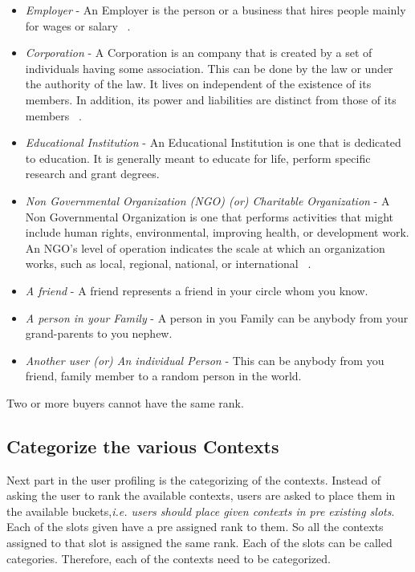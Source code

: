 \begin{itemize}
\item {\it Employer} - An Employer is the person or a business that hires people mainly for wages or salary ~\cite{employerdict}.
\item {\it Corporation} - A Corporation is an company that is created by a set of
individuals having some association. This can be done by the law or under the authority of the law. It lives on independent of the 
existence of its members. In addition, its power and liabilities are distinct from those of its members ~\cite{corporationdict}.
\item {\it Educational Institution} - An Educational Institution is one that is dedicated to education. It is generally meant to educate for life, perform
specific research and grant degrees.
\item {\it Non Governmental Organization (NGO) (or) Charitable Organization} - A Non Governmental Organization is one that performs activities that might include human rights, environmental, improving health, or development work. An NGO's level of operation indicates the scale at which an organization works, such as local, regional, national, or international ~\cite{ngointro}.
\item {\it A friend} - A friend represents a friend in your circle whom you know.
\item {\it A person in your Family} - A person in you Family can be anybody from your grand-parents to you nephew.
\item {\it Another user (or) An individual Person} - This can be anybody from you friend, family member to a random person in the world.

\end{itemize}

Two or more buyers cannot have the same rank.

\subsection{Categorize the various Contexts}

Next part in the user profiling is the categorizing of the contexts. Instead of asking the user to rank the available contexts, users are asked to
place them in the available buckets,{\it i.e. users should place given contexts in pre existing slots}. Each of the slots given have a pre assigned rank to them. So all the contexts assigned to that slot is assigned the same rank. Each of the slots can be called categories. Therefore, each of the
contexts need to be categorized.

